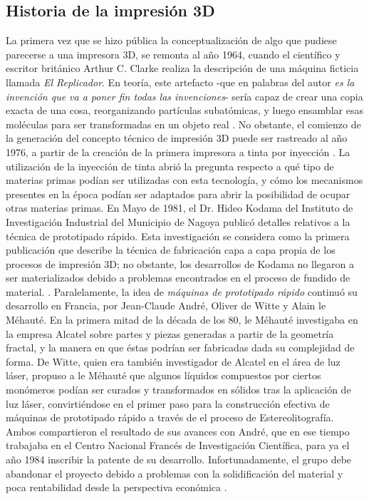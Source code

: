 \subsection{Historia de la impresión 3D}

La primera vez que se hizo pública la conceptualización de algo que pudiese parecerse a una impresora 3D, se remonta al año 1964, cuando el científico y escritor británico Arthur C. Clarke realiza la descripción de una máquina ficticia llamada \textit{El Replicador}. En teoría, este artefacto -que en palabras del autor \textit{es la invención que va a poner fin todas las invenciones}- sería capaz de crear una copia exacta de una cosa, reorganizando partículas subatómicas, y luego ensamblar esas moléculas para ser transformadas en un objeto real \citep{renstrom2012}. No obstante, el comienzo de la generación del concepto técnico de impresión 3D puede ser rastreado al año 1976, a partir de la creación de la primera impresora a tinta por inyección \citep{maxey2013}. La utilización de la inyección de tinta abrió la pregunta respecto a qué tipo de materias primas podían ser utilizadas con esta tecnología, y cómo los mecanismos presentes en la época podían ser adaptados para abrir la posibilidad de ocupar otras materias primas. En Mayo de 1981, el Dr. Hideo Kodama del Instituto de Investigación Industrial del Municipio de Nagoya publicó detalles relativos a la técnica de prototipado rápido. Esta investigación se considera como la primera publicación que describe la técnica de fabricación capa a capa propia de los procesos de impresión 3D; no obstante, los desarrollos de Kodama no llegaron a ser materializados debido a problemas encontrados en el proceso de fundido de material. \citep{tresdsourced2020}. Paralelamente, la idea de \textit{máquinas de prototipado rápido} continuó su desarrollo en Francia, por Jean-Claude André, Oliver de Witte y Alain le Méhauté. En la primera mitad de la década de los 80, le Méhauté investigaba en la empresa Alcatel sobre partes y piezas generadas a partir de la geometría fractal, y la manera en que éstas podrían ser fabricadas dada su complejidad de forma.
De Witte, quien era también investigador de Alcatel en el área de luz láser, propuso a le Méhauté que algunos líquidos compuestos por ciertos monómeros podían ser curados y transformados en sólidos tras la aplicación de luz láser, convirtiéndose en el primer paso para la construcción efectiva de máquinas de prototipado rápido a través de el proceso de Estereolitografía. Ambos compartieron el resultado de sus avances con André, que en ese tiempo trabajaba en el Centro Nacional Francés de Investigación Científica, para ya el año 1984 inscribir la patente de su desarrollo. Infortunadamente, el grupo debe abandonar el proyecto debido a problemas con la solidificación del material y poca rentabilidad desde la perspectiva económica \citep{alltresdp2018}.\

